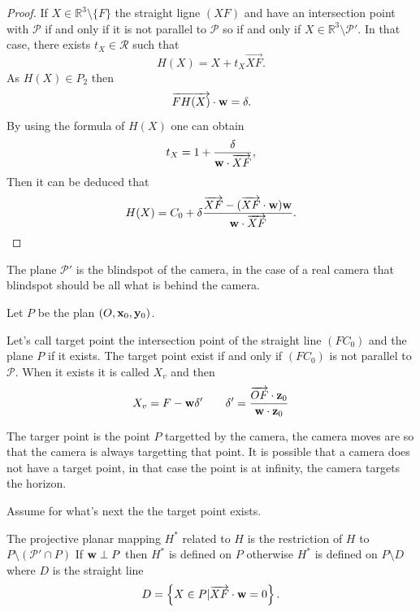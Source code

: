 \begin{proof}
If $X\in \mathbb{R}^3 \setminus \{F\}$ the straight ligne $(XF)$ and have an intersection point with $\mathcal{P}$ if and only if it is not parallel to  $\mathcal{P}$ so if and only if $X\in \mathbb{R}^3 \setminus \mathcal{P}'$. In that case, there exists $t_X\in \mathcal{R}$ such that
\begin{equation*}
H(X)=X+t_{X}\overrightarrow{XF}.
\end{equation*}
As $H(X)\in P_{2}$ then
\begin{equation*}
\overrightarrow{FH(X)}\cdot \mathbf{w} =\delta.
\end{equation*}
By using the formula of $H(X)$ one can obtain
\begin{equation*}
t_{X}=1+\frac{\delta}{\mathbf{w} \cdot \overrightarrow{XF}},
\end{equation*}
 Then it can be deduced that
\begin{equation*}
H(X) = C_0 +  \delta \frac{\overrightarrow{XF}-(\overrightarrow{XF}\cdot \mathbf{w} )\mathbf{w}}{\mathbf{w} \cdot \overrightarrow{XF}}.
\end{equation*}
\end{proof}
\begin{remarque}
The plane $\mathcal{P}'$ is the blindspot of the camera, in the case of a real camera that blindspot should be all what is behind the camera.
\end{remarque}
Let $P$ be the plan $(O,\mathbf{x}_0,\mathbf{y}_0)$.
\begin{Def} Let's call target point the intersection point of the straight line $(FC_0)$ and the plane $P$ if it exists. The target point exist if and only if $(FC_0)$ is not parallel to $\mathcal{P}$. When it exists it is called $X_v$ and then
\begin{equation*}
X_v=F-\mathbf{w} \delta'~~~~~~\delta'=\frac{\overrightarrow{OF}\cdot \mathbf{z}_0}{\mathbf{w} \cdot \mathbf{z}_0}
\label{formule_point_vise}
\end{equation*}
\label{point_vise}
\end{Def}
\begin{remarque}
The targer point is the point $P$ targetted by the camera, the camera moves are so that the camera is always targetting that point. It is possible that a camera does not have a target point, in that case the point is at infinity, the camera targets the horizon.
\end{remarque}
Assume for what's next the the target point exists.
\begin{Def}
The projective planar mapping $H^*$ related to $H$ is the restriction of $H$ to $P\setminus (\mathcal{P}'\cap P)$ 
If $\mathbf{w} \perp P $ then $H^*$ is defined on $P$ otherwise $H^*$ is defined on $P\setminus D$ where $D$ is the straight line
\begin{equation*}
D=\left\{ X\in P | \overrightarrow{XF}\cdot \mathbf{w} = 0\right\}.
\end{equation*}
\end{Def}
